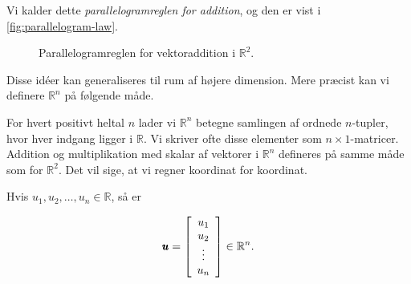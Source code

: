 Vi kalder dette \textit{parallelogramreglen for addition}, og den er vist i \autoref{fig:parallelogram-law}.

\begin{figure}[htbp]
    \centering
    \caption{Parallelogramreglen for vektoraddition i $\mathbb{R}^2$.}
    \label{fig:parallelogram-law}
\end{figure}

Disse idéer kan generaliseres til rum af højere dimension. Mere præcist kan vi definere $\mathbb{R}^n$ på følgende måde.

\begin{definition}
    For hvert positivt heltal $n$ lader vi $\mathbb{R}^n$ betegne samlingen af ordnede $n$-tupler, hvor hver indgang ligger i $\mathbb{R}$. Vi skriver ofte disse elementer som $n \times 1$-matricer. Addition og multiplikation med skalar af vektorer i $\mathbb{R}^n$ defineres på samme måde som for $\mathbb{R}^2$. Det vil sige, at vi regner koordinat for koordinat.
\end{definition}

\begin{example}
    Hvis $u_1, u_2, \ldots, u_n \in \mathbb{R}$, så er

    \[
    \pmb{u} = \left[\begin{array}{c}
    u_1 \\
    u_2 \\
    \vdots \\
    u_n
    \end{array}\right] \in \mathbb{R}^n.
    \]
     
\end{example}

